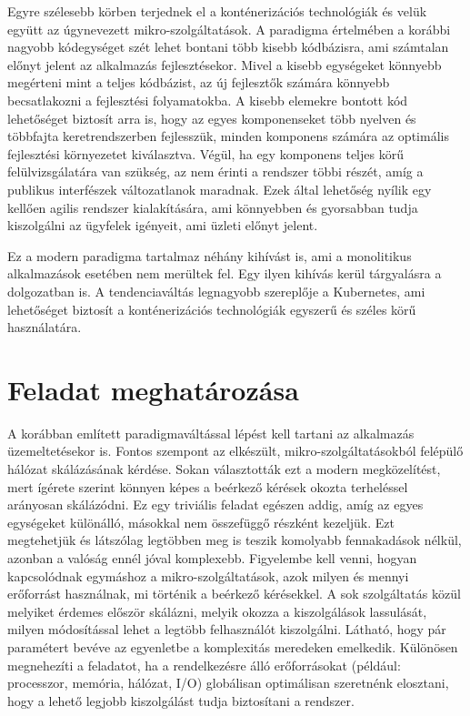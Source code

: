 Egyre szélesebb körben terjednek el a konténerizációs technológiák és velük együtt az úgynevezett mikro-szolgáltatások\citep{monoliticAndMicroserviceArchitecture}.
A paradigma értelmében a korábbi nagyobb kódegységet szét lehet bontani több kisebb kódbázisra, ami számtalan előnyt jelent az alkalmazás fejlesztésekor.
Mivel a kisebb egységeket könnyebb megérteni mint a teljes kódbázist, az új fejlesztők számára könnyebb becsatlakozni a fejlesztési folyamatokba.
A kisebb elemekre bontott kód lehetőséget biztosít arra is, hogy az egyes komponenseket több nyelven és többfajta keretrendszerben fejlesszük, minden komponens számára az optimális fejlesztési környezetet kiválasztva. 
Végül, ha egy komponens teljes körű felülvizsgálatára van szükség, az nem érinti a rendszer többi részét, amíg a publikus interfészek változatlanok maradnak. 
Ezek által lehetőség nyílik egy kellően agilis rendszer kialakítására, ami könnyebben és gyorsabban tudja kiszolgálni az ügyfelek igényeit, ami üzleti előnyt jelent.

Ez a modern paradigma tartalmaz néhány kihívást is, ami a monolitikus alkalmazások esetében nem merültek fel.
Egy ilyen kihívás kerül tárgyalásra a dolgozatban is.
A tendenciaváltás legnagyobb szereplője a Kubernetes\citep{kubernetesBaseDocumentation}, ami lehetőséget biztosít a konténerizációs technológiák egyszerű és széles körű használatára.

\section{Feladat meghatározása}
A korábban említett paradigmaváltással lépést kell tartani az alkalmazás üzemeltetésekor is. 
Fontos szempont az elkészült, mikro-szolgáltatásokból felépülő hálózat skálázásának kérdése. 
Sokan választották ezt a modern megközelítést, mert ígérete szerint könnyen képes a beérkező kérések okozta terheléssel arányosan skálázódni.
Ez egy triviális feladat egészen addig, amíg az egyes egységeket különálló, másokkal nem összefüggő részként kezeljük.
Ezt megtehetjük és látszólag legtöbben meg is teszik komolyabb fennakadások nélkül, azonban a valóság ennél jóval komplexebb.
Figyelembe kell venni, hogyan kapcsolódnak egymáshoz a mikro-szolgáltatások, azok milyen és mennyi erőforrást használnak, mi történik a beérkező kérésekkel.
A sok szolgáltatás közül melyiket érdemes először skálázni, melyik okozza a kiszolgálások lassulását, milyen módosítással lehet a legtöbb felhasználót kiszolgálni.
Látható, hogy pár paramétert bevéve az egyenletbe a komplexitás meredeken emelkedik. 
Különösen megnehezíti a feladatot, ha a rendelkezésre álló erőforrásokat (például: processzor, memória, hálózat, I/O) globálisan optimálisan szeretnénk elosztani, hogy a lehető legjobb kiszolgálást tudja biztosítani a rendszer. 

